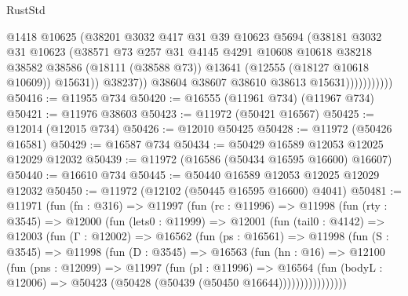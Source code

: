 \begin{lexlean}{RustStd}
\begin{coremodule}
                            @1418
                            @10625
                            (@38201
                              @3032
                              @417
                              @31
                              @39
                              @10623
                              @5694
                              (@38181
                                @3032
                                @31
                                @10623
                                (@38571
                                  @73
                                  @257
                                  @31
                                  @4145
                                  @4291
                                  @10608
                                  @10618
                                  @38218
                                  @38582
                                  @38586
                                  (@18111 (@38588 @73))
                                  @13641
                                  (@12555 (@18127 @10618 @10609))
                                  @15631))
                              @38237))
                          @38604
                          @38607
                          @38610
                          @38613
                          @15631)))))))))))
@50416 := @11955 @734
@50420 := @16555 (@11961 @734) (@11967 @734)
@50421 := @11976 @38603
@50423 := @11972 (@50421 @16567)
@50425 := @12014 (@12015 @734)
@50426 := @12010 @50425
@50428 := @11972 (@50426 @16581)
@50429 := @16587 @734
@50434 := @50429 @16589 @12053 @12025 @12029 @12032
@50439 := @11972 (@16586 (@50434 @16595 @16600) @16607)
@50440 := @16610 @734
@50445 := @50440 @16589 @12053 @12025 @12029 @12032
@50450 := @11972 (@12102 (@50445 @16595 @16600) @4041)
@50481 := @11971
    (fun (fn : @316) =>
    @11997
      (fun (rc : @11996) =>
      @11998
        (fun (rty : @3545) =>
        @12000
          (fun (lets0 : @11999) =>
          @12001
            (fun (tail0 : @4142) =>
            @12003
              (fun (Γ : @12002) =>
              @16562
                (fun (ps : @16561) =>
                @11998
                  (fun (S : @3545) =>
                  @11998
                    (fun (D : @3545) =>
                    @16563
                      (fun (hn : @16) =>
                      @12100
                        (fun (pns : @12099) =>
                        @11997
                          (fun (pl : @11996) =>
                          @16564
                            (fun (bodyL : @12006) =>
                            @50423 (@50428 (@50439 (@50450 @16644))))))))))))))))

\end{coremodule}
\end{lexlean}

